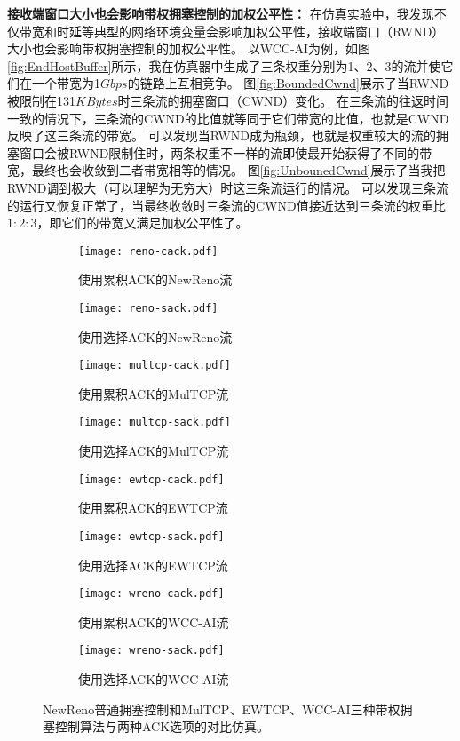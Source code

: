 \documentclass[winfonts]{njuthesis}
\begin{document}
\textbf{接收端窗口大小也会影响带权拥塞控制的加权公平性：}
在仿真实验中，我发现不仅带宽和时延等典型的网络环境变量会影响加权公平性，接收端窗口（RWND）大小也会影响带权拥塞控制的加权公平性。
以WCC-AI为例，如图\ref{fig:EndHostBuffer}所示，我在仿真器中生成了三条权重分别为1、2、3的流并使它们在一个带宽为1$Gbps$的链路上互相竞争。
图\ref{fig:BoundedCwnd}展示了当RWND被限制在131$KBytes$时三条流的拥塞窗口（CWND）变化。
在三条流的往返时间一致的情况下，三条流的CWND的比值就等同于它们带宽的比值，也就是CWND反映了这三条流的带宽。
可以发现当RWND成为瓶颈，也就是权重较大的流的拥塞窗口会被RWND限制住时，两条权重不一样的流即使最开始获得了不同的带宽，最终也会收敛到二者带宽相等的情况。
图\ref{fig:UnbounedCwnd}展示了当我把RWND调到极大（可以理解为无穷大）时这三条流运行的情况。
可以发现三条流的运行又恢复正常了，当最终收敛时三条流的CWND值接近达到三条流的权重比$1:2:3$，即它们的带宽又满足加权公平性了。

\begin{figure}[ht!]
	\begin{subfigure}{.5\textwidth}
    \centering
		\texttt{[image: reno-cack.pdf]}
    \caption{使用累积ACK的NewReno流}
    \label{fig:renoCack}
  \end{subfigure}
	\begin{subfigure}{.5\textwidth}
    \centering
		\texttt{[image: reno-sack.pdf]}
    \caption{使用选择ACK的NewReno流}
    \label{fig:renoSack}
  \end{subfigure}
	\begin{subfigure}{.5\textwidth}
    \centering
		\texttt{[image: multcp-cack.pdf]}
    \caption{使用累积ACK的MulTCP流}
    \label{fig:multcpCack}
  \end{subfigure}
	\begin{subfigure}{.5\textwidth}
    \centering
		\texttt{[image: multcp-sack.pdf]}
    \caption{使用选择ACK的MulTCP流}
    \label{fig:multcpSack}
  \end{subfigure}
	\begin{subfigure}{.5\textwidth}
    \centering
		\texttt{[image: ewtcp-cack.pdf]}
    \caption{使用累积ACK的EWTCP流}
    \label{fig:ewtcpCack}
  \end{subfigure}
	\begin{subfigure}{.5\textwidth}
    \centering
		\texttt{[image: ewtcp-sack.pdf]}
    \caption{使用选择ACK的EWTCP流}
    \label{fig:ewtcpSack}
  \end{subfigure}
	\begin{subfigure}{.5\textwidth}
    \centering
		\texttt{[image: wreno-cack.pdf]}
    \caption{使用累积ACK的WCC-AI流}
    \label{fig:wrenoCack}
  \end{subfigure}
	\begin{subfigure}{.5\textwidth}
    \centering
		\texttt{[image: wreno-sack.pdf]}
    \caption{使用选择ACK的WCC-AI流}
    \label{fig:wrenoSack}
  \end{subfigure}
	\caption{NewReno普通拥塞控制和MulTCP、EWTCP、WCC-AI三种带权拥塞控制算法与两种ACK选项的对比仿真。}
	\label{fig:CackSackDiff}
\end{figure}
\end{document}

